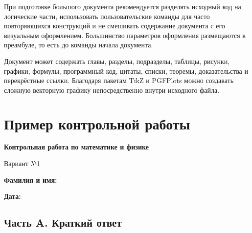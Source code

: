 \documentclass[12pt,a4paper]{article}
\theoremstyle{definition}
\theoremstyle{remark}
\begin{document}
При подготовке большого документа рекомендуется разделять исходный код
на логические части, использовать пользовательские команды для часто
повторяющихся конструкций и не смешивать содержание документа с его
визуальным оформлением. Большинство параметров оформления размещаются
в преамбуле, то есть до команды начала документа.

Документ может содержать главы, разделы, подразделы, таблицы, рисунки,
графики, формулы, программный код, цитаты, списки, теоремы,
доказательства и перекрёстные ссылки. Благодаря пакетам TikZ и PGFPlots
можно создавать сложную векторную графику непосредственно внутри
исходного файла.


\section{Пример контрольной работы}

\begin{center}
    {\Large\bfseries Контрольная работа по математике и физике}

    \vspace{3mm}

    Вариант №1
\end{center}

\textbf{Фамилия и имя:}
\underline{\hspace{8cm}}

\vspace{4mm}

\textbf{Дата:}
\underline{\hspace{4cm}}

\vspace{8mm}

\subsection*{Часть A. Краткий ответ}
\end{document}
